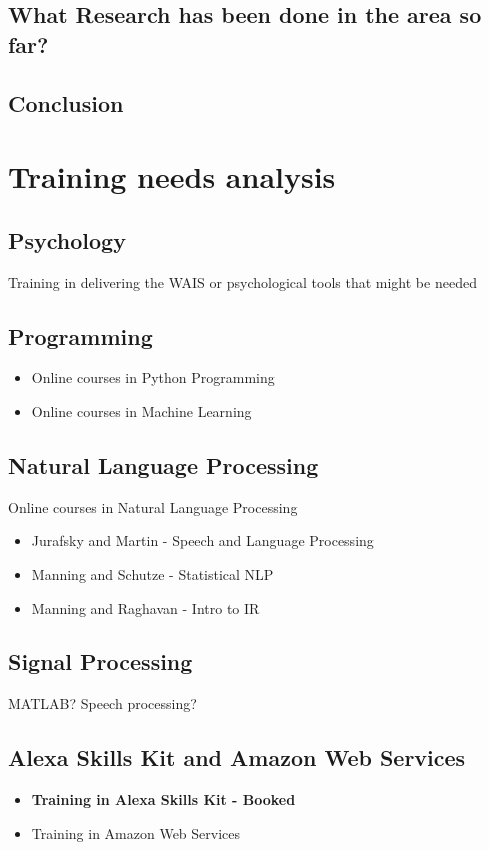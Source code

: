 \documentclass{article}
\begin{document}
	\subsection{What Research has been done in the area so far?}
	\subsection{Conclusion}
	
	\section{Training needs analysis}
	\subsection{Psychology}
	Training in delivering the WAIS or psychological tools that might be needed 
	\subsection{Programming}
	\begin{itemize}
		\item Online courses in Python Programming
		\item Online courses in Machine Learning
	\end{itemize}

	\subsection{Natural Language Processing}
	Online courses in Natural Language Processing
	
	\begin{itemize}
		\item Jurafsky and Martin - Speech and Language Processing 
		\item Manning and Schutze - Statistical NLP 
		\item Manning and Raghavan - Intro to IR
	\end{itemize}
	
	\subsection{Signal Processing}
	MATLAB? Speech processing?
	
	\subsection{Alexa Skills Kit and Amazon Web Services}
	\begin{itemize}
		\item \textbf{Training in Alexa Skills Kit - Booked}
		\item Training in Amazon Web Services
	\end{itemize}
\end{document}
